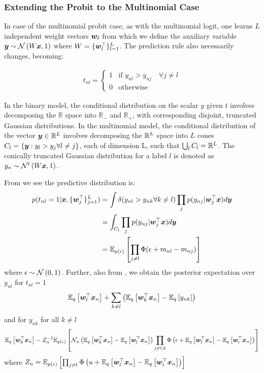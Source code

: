 

\subsubsection*{Extending the Probit to the Multinomial Case}
In case of the multinomial probit case, as with the multinomial logit, one learns $L$ independent weight vectors $\vv{w}_l$ from which we define the auxiliary variable $\vv{y} \sim \nor{W\vv{x}}{1}$ where $W = \{ \vv{w}_l\T \}_{l=1}^L$. The prediction rule also necessarily changes, becoming:

\begin{align}
t_{nl} = \left\{ \begin{array}{lr} 1 & \text{if } y_{nl} > y_{nj} \quad \forall j \neq l \\ 0 & \text{otherwise} \end{array} \right.
\end{align}

In the binary model, the conditional distribution on the scalar $y$ given $t$ involves decomposing the $\mathbb{R}$ space into $\mathbb{R}_-$ and $\mathbb{R}_+$, with corresponding disjoint, truncated Gaussian distributions. In the multinomial model, the conditional distribution of the vector $\vv{y} \in \VReal{L}$ involves decomposing the $\VReal{L}$ space into $L$ cones $C_l = \{ \vv{y} : y_l > y_j \forall l \neq j \}$, each of dimension L, such that $\bigcup_l C_l = \VReal{L}$. The conically truncated Gaussian distribution for a label $l$ is denoted as $y_n \sim \mathcal{N}^{l}\left(W\vv{x}, 1\right)$. 

From \cite{Girolami2007} we see the predictive distribution is:
\begin{align}
p(t_{nl} = 1 | \vv{x}, \{ \vv{w}_j\T \}_{j=1}^L) & =
\int \delta (y_{nl} > y_{nk} \forall k \neq l) \prod_j p(y_{nj} | \vv{w}_j\T\vv{x}) d\vv{y} \\
&= \int_{C_l} \prod_j p(y_{nj} | \vv{w}_j\T\vv{x}) d\vv{y} \\
&= \ex{\prod_{j \neq l} \Phi(\epsilon + m_{nl} - m_{nj})}{p(\epsilon)}
\end{align}
where $\epsilon \sim \nor{0}{1}$. Further, also from \cite{Girolami2007}, we obtain the posterior expectation over $y_{nl}$ for $t_{nl} = 1$
\begin{align}
\ex{\vv{w}_l\T\vv{x}_n}{q} + \sum_{k \neq l} \left(\ex{\vv{w}_k\T\vv{x}_n}{q} - \ex{y_{nk}}{q}\right)
\end{align}
and for $y_{nk}$ for all $k \neq l$
\begin{align}
\ex{\vv{w}_k\T\vv{x}_n}{q} - Z_n^{-1}\ex{\mathcal{N}_u\left(\ex{\vv{w}_k\T\vv{x}_n}{q} - \ex{\vv{w}_l\T\vv{x}_n}{q} \right) \prod_{j \neq l,k}\Phi\left(\epsilon + \ex{\vv{w}_l\T\vv{x}_n}{q} - \ex{\vv{w}_i\T\vv{x}_n}{q} \right) }{p(\epsilon)} 
\end{align}
where $Z_n = \ex{\prod_{j \neq l}\Phi\left(u + \ex{\vv{w}_l\T\vv{x}_n}{q} - \ex{\vv{w}_i\T\vv{x}_n}{q} \right) }{p(\epsilon)}$




